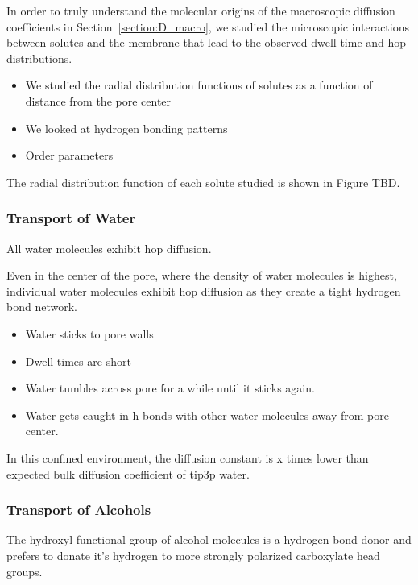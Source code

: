 \documentclass{article}
\begin{document}
  In order to truly understand the molecular origins of the macroscopic
  diffusion coefficients in Section~\ref{section:D_macro}, we studied the
  microscopic interactions between solutes and the membrane that lead to the
  observed dwell time and hop distributions.
  \begin{itemize}
	\item We studied the radial distribution functions of solutes as a
	function of distance from the pore center
	\item We looked at hydrogen bonding patterns
	\item Order parameters
  \end{itemize}

  The radial distribution function of each solute studied is shown in 
  Figure TBD.

  \subsubsection*{Transport of Water}

  All water molecules exhibit hop diffusion.

  Even in the center of the pore, where the density of water molecules is
  highest, individual water molecules exhibit hop diffusion as they create a
  tight hydrogen bond network.
  \begin{itemize}
	\item Water sticks to pore walls
	\item Dwell times are short
	\item Water tumbles across pore for a while until it sticks again. 
	\item Water gets caught in h-bonds with other water molecules away
	from pore center.
  \end{itemize}

  In this confined environment, the diffusion constant is x times lower than
  expected bulk diffusion coefficient of tip3p water.

  
  \subsubsection*{Transport of Alcohols}

  The hydroxyl functional group of alcohol molecules is a hydrogen bond donor
  and prefers to donate it's hydrogen to more strongly polarized carboxylate head
  groups.
\end{document}
